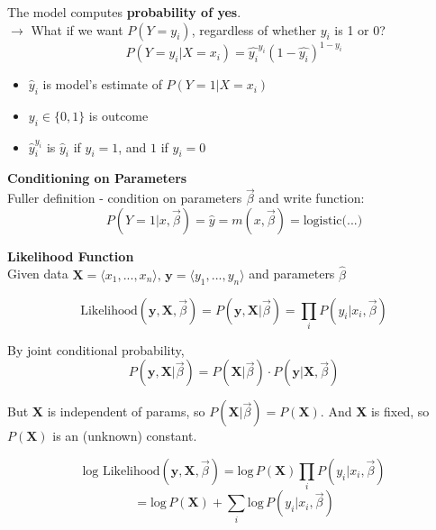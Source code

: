 \documentclass[letterpaper, 10.5pt,landscape]{article}
\begin{document}
\begin{multicols*}{3}
The model computes \textbf{probability of yes}.\\
$\rightarrow$ What if we want $P(Y=y_{i})$, regardless of whether $y_{i}$ is 1 or 0? \\
\vspace{-5pt}
\[P \left(Y=y_{i} | X=x_{i} \right) = \hat{y_{i}}^{y_{i}} \left(1- \hat{y_{i}}\right)^{1-y_{i}}  \]

\begin{itemize}
    \item $\hat{y}_{i}$ is model's estimate of $P(Y=1|X=x_{i})$
    \item $y_{i} \in \{0,1 \}$ is outcome
    \item $\hat{y}_{i}^{y_{i}}$ is $\hat{y}_{i}$ if $y_{i} = 1$, and $1$ if $y_{i} = 0$ 
\end{itemize}

\textbf{Conditioning on Parameters} \\
Fuller definition -  condition on parameters $\vec{\beta}$ and write function: 
\vspace{-2pt}
\[P(Y=1|x, \vec{\beta}) = \hat{y} = m(x, \vec{\beta}) = \text{logistic(...)}\]

\vspace{3pt}
\textbf{Likelihood Function} \\


Given data \(\textbf{X} = \langle x_{1}, ..., x_{n}\rangle, \hspace{2pt}  \textbf{y} = \langle y_{1}, ... , y_{n} \rangle \) and parameters $\hat{\beta}$
\vspace{-3pt}

\[\text{Likelihood} (\textbf{y}, \textbf{X}, \vec{\beta}) = P(\textbf{y},\textbf{X}|\vec{\beta}) = \prod_{i} P(y_{i}|x_{i}, \vec{\beta}) \]


\vspace{-3pt}

By joint conditional probability, 
\vspace{-2pt}
\[ P(\textbf{y},\textbf{X} | \vec{\beta}) =  P(\textbf{X}|\vec{\beta}) \cdot P(\textbf{y} | \textbf{X}, \vec{\beta}) \]

But \textbf{X} is independent of params, so \(P(\textbf{X}|\vec{\beta}) = P(\textbf{X}) \). And \textbf{X} is fixed, so \(P(\textbf{X}) \) is an (unknown) constant.

\vspace{-5pt}

\[\text{log Likelihood}(\textbf{y},\textbf{X}, \vec{\beta}) = \text{log} \, P(\textbf{X}) \prod_{i} P\left( y_{i}|x_{i}, \vec{\beta} \right) \]
\vspace{-5pt}
\[= \text{log} \, P(\textbf{X})  + \sum_{i} \text{log} \, P \left( y_{i}|x_{i}, \vec{\beta} \right) \] 


\end{multicols*}
\end{document}
